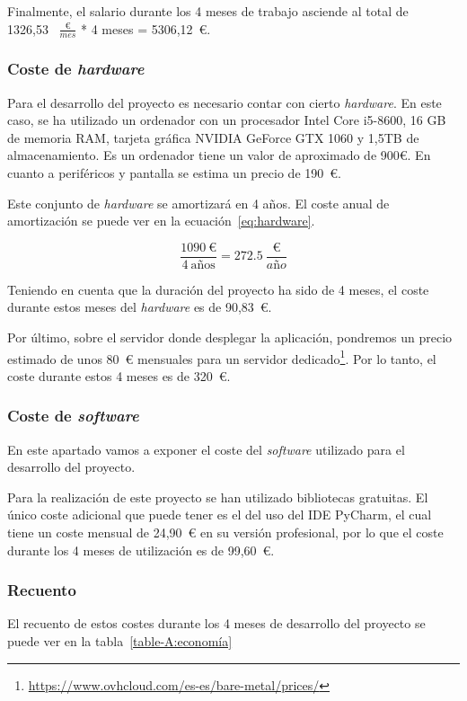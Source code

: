 Finalmente, el salario durante los 4 meses de trabajo asciende al total de 1326,53~ $\frac{\text{€}}{mes}$ * 4 meses = 5306,12~€.


\subsubsection{Coste de \textit{hardware}}
Para el desarrollo del proyecto es necesario contar con cierto \textit{hardware}.
En este caso, se ha utilizado un ordenador con un procesador Intel Core i5-8600, 16 GB de memoria RAM, tarjeta gráfica NVIDIA GeForce GTX 1060 y 1,5TB de almacenamiento.
Es un ordenador tiene un valor de aproximado de 900€. En cuanto a periféricos y pantalla se estima un precio de 190~€.

Este conjunto de \textit{hardware} se amortizará en 4 años. El coste anual de amortización se puede ver en la ecuación~\ref{eq:hardware}.

\begin{equation}\label{eq:hardware}
\frac{1090~\text{€}}{4~\text{años}} = 272.5~\frac{\text{€}}{año}
\end{equation}

Teniendo en cuenta que la duración del proyecto ha sido de 4 meses, el coste durante estos meses del \textit{hardware} es de 90,83~€.

Por último, sobre el servidor donde desplegar la aplicación, pondremos un precio estimado de unos 80~€ mensuales para un servidor dedicado\footnote{\url{https://www.ovhcloud.com/es-es/bare-metal/prices/}}. Por lo tanto, el coste durante estos 4 meses es de 320~€.

\subsubsection{Coste de \textit{software}}
En este apartado vamos a exponer el coste del \textit{software} utilizado para el desarrollo del proyecto.

Para la realización de este proyecto se han utilizado bibliotecas gratuitas. 
El único coste adicional que puede tener es el del uso del IDE PyCharm, el cual tiene un coste mensual de 24,90~€ en su versión profesional, por lo que el coste durante los 4 meses de utilización es de 99,60~€.

\subsubsection{Recuento}
El recuento de estos costes durante los 4 meses de desarrollo del proyecto se puede ver en la tabla~\ref{table-A:economía}


